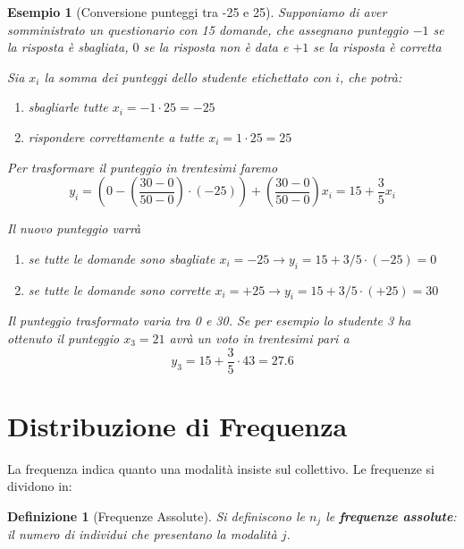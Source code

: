 \documentclass[
  11pt,
]{book}
\providecommand{\tightlist}{%
  \setlength{\itemsep}{0pt}\setlength{\parskip}{0pt}}
\theoremstyle{mytheoremstyle}
\theoremstyle{mydefstyle}
\newtheorem{definition}{Definizione}[section]
\newtheorem{example}{{Esempio}}[section]
\begin{document}
\begin{example}[Conversione punteggi tra -25 e 25]
Supponiamo di aver somministrato un questionario con 15 domande, che assegnano punteggio \(-1\) se la risposta è sbagliata,
\(0\) se la risposta non è data e \(+1\) se la risposta è corretta

Sia \(x_i\) la somma dei punteggi dello studente etichettato con \(i\), che potrà:

\begin{enumerate}
\def\labelenumi{\arabic{enumi}.}
\tightlist
\item
  sbagliarle tutte \(x_i=-1\cdot 25 =-25\)
\item
  rispondere correttamente a tutte \(x_i=1\cdot 25 =25\)
\end{enumerate}

Per trasformare il punteggio in trentesimi faremo
\[
y_i = \left(0 - \left(\frac{30-0}{50-0}\right)\cdot (-25)\right)+\left(\frac{30-0}{50-0}\right) x_i=15+\frac 35x_i
\]

Il nuovo punteggio varrà

\begin{enumerate}
\def\labelenumi{\arabic{enumi}.}
\tightlist
\item
  se tutte le domande sono sbagliate \(x_i = -25 \rightarrow y_i = 15+3/5\cdot(-25)=0\)
\item
  se tutte le domande sono corrette \(x_i = +25 \rightarrow y_i = 15+3/5\cdot(+25)=30\)
\end{enumerate}

Il punteggio trasformato varia tra 0 e 30. Se per esempio lo studente 3 ha ottenuto il punteggio \(x_3=21\) avrà un voto in trentesimi pari a
\[
y_3=15+\frac{3}{5}\cdot43=27.6
\]
\end{example}

\section{Distribuzione di Frequenza}\label{distribuzione-di-frequenza}

La frequenza indica quanto una modalità insiste sul collettivo. Le frequenze si dividono in:

\begin{info}

\begin{definition}[Frequenze Assolute]
Si definiscono le \(n_j\) le \textbf{frequenze assolute}: il numero di individui che presentano la modalità \(j\).
\end{definition}

\end{info}
\end{document}
